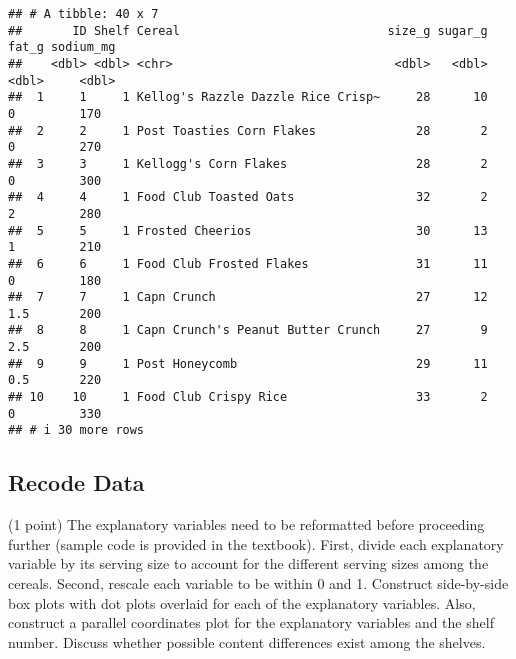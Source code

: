 \documentclass[
  11pt,
]{article}
\begin{document}
\begin{verbatim}
## # A tibble: 40 x 7
##       ID Shelf Cereal                             size_g sugar_g fat_g sodium_mg
##    <dbl> <dbl> <chr>                               <dbl>   <dbl> <dbl>     <dbl>
##  1     1     1 Kellog's Razzle Dazzle Rice Crisp~     28      10   0         170
##  2     2     1 Post Toasties Corn Flakes              28       2   0         270
##  3     3     1 Kellogg's Corn Flakes                  28       2   0         300
##  4     4     1 Food Club Toasted Oats                 32       2   2         280
##  5     5     1 Frosted Cheerios                       30      13   1         210
##  6     6     1 Food Club Frosted Flakes               31      11   0         180
##  7     7     1 Capn Crunch                            27      12   1.5       200
##  8     8     1 Capn Crunch's Peanut Butter Crunch     27       9   2.5       200
##  9     9     1 Post Honeycomb                         29      11   0.5       220
## 10    10     1 Food Club Crispy Rice                  33       2   0         330
## # i 30 more rows
\end{verbatim}

\hypertarget{recode-data}{%
\subsection{Recode Data}\label{recode-data}}

(1 point) The explanatory variables need to be reformatted before
proceeding further (sample code is provided in the textbook). First,
divide each explanatory variable by its serving size to account for the
different serving sizes among the cereals. Second, rescale each variable
to be within 0 and 1. Construct side-by-side box plots with dot plots
overlaid for each of the explanatory variables. Also, construct a
parallel coordinates plot for the explanatory variables and the shelf
number. Discuss whether possible content differences exist among the
shelves.
\end{document}
